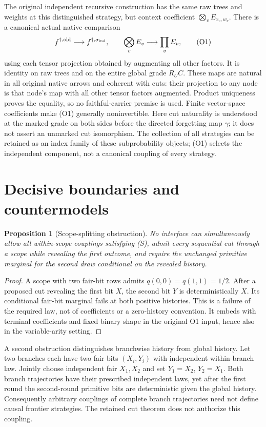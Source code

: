 \documentclass[11pt]{article}
\newtheorem{proposition}[theorem]{Proposition}
\begin{document}
The original independent recursive construction has the same raw trees and weights at this distinguished strategy, but context coefficient $\bigotimes_v E_{x_v,w_v}$. There is a canonical actual native comparison
\[
 f^{\dagger,\mathrm{old}}\longrightarrow f^{\dagger,\sigma_{\rm ind}},
 \qquad \bigotimes_v E_v\longrightarrow\prod_v E_v,            \tag{O1}
\]
using each tensor projection obtained by augmenting all other factors. It is identity on raw trees and on the entire global grade $R_U C$. These maps are natural in all original native arrows and coherent with cuts: their projection to any node is that node's map with all other tensor factors augmented. Product uniqueness proves the equality, so no faithful-carrier premise is used. Finite vector-space coefficients make (O1) generally noninvertible. Here cut naturality is understood at the marked grade on both sides before the directed forgetting map $\gamma$; it does not assert an unmarked cut isomorphism. The collection of all strategies can be retained as an index family of these subprobability objects; (O1) selects the independent component, not a canonical coupling of every strategy.

\section{Decisive boundaries and countermodels}
\begin{proposition}[Scope-splitting obstruction]
No interface can simultaneously allow all within-scope couplings satisfying (S), admit every sequential cut through a scope while revealing the first outcome, and require the unchanged primitive marginal for the second draw conditional on the revealed history.
\end{proposition}
\begin{proof}
A scope with two fair-bit rows admits $q(0,0)=q(1,1)=1/2$. After a proposed cut revealing the first bit $X$, the second bit $Y$ is deterministically $X$. Its conditional fair-bit marginal fails at both positive histories. This is a failure of the required law, not of coefficients or a zero-history convention. It embeds with terminal coefficients and fixed binary shape in the original O1 input, hence also in the variable-arity setting.
\end{proof}

A second obstruction distinguishes branchwise history from global history. Let two branches each have two fair bits $(X_i,Y_i)$ with independent within-branch law. Jointly choose independent fair $X_1,X_2$ and set $Y_1=X_2$, $Y_2=X_1$. Both branch trajectories have their prescribed independent laws, yet after the first round the second-round primitive bits are deterministic given the global history. Consequently arbitrary couplings of complete branch trajectories need not define causal frontier strategies. The retained cut theorem does not authorize this coupling.
\end{document}
